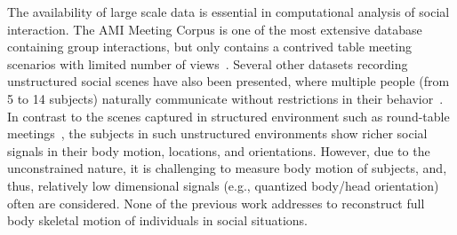 The availability of large scale data is essential in computational analysis of social interaction. The AMI Meeting Corpus is one of the most extensive database containing group interactions, but only contains a contrived table meeting scenarios with limited number of views~\cite{carletta2005ami}. Several other datasets recording unstructured social scenes have also been presented, where multiple people (from 5 to 14 subjects) naturally communicate without restrictions in their behavior~\cite{Zen-10,Cristani-11,SALSA-15}. In contrast to the scenes captured in structured environment such as round-table meetings~\cite{carletta2005ami, Lepri-12}, the subjects in such unstructured environments show richer social signals in their body motion, locations, and orientations. However, due to the unconstrained nature, it is challenging to measure body motion of subjects, and, thus, relatively low dimensional signals (e.g., quantized body/head orientation) often are considered. None of the previous work addresses to reconstruct full body skeletal motion of individuals in social situations. %
%

